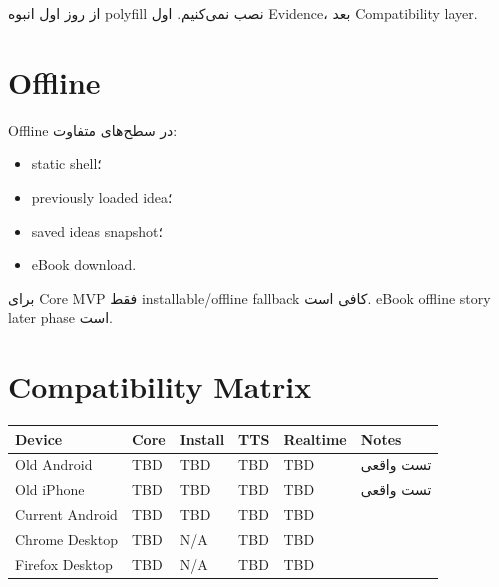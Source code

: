 \begin{warningbox}
از روز اول انبوه polyfill نصب نمی‌کنیم. اول Evidence، بعد Compatibility layer.
\end{warningbox}

\section{Offline}

Offline در سطح‌های متفاوت:
\begin{itemize}
  \item static shell؛
  \item previously loaded idea؛
  \item saved ideas snapshot؛
  \item eBook download.
\end{itemize}

برای Core MVP فقط installable/offline fallback کافی است. eBook offline story later phase است.

\section{Compatibility Matrix}

\begin{longtable}{p{2.8cm}p{1.5cm}p{1.6cm}p{1.5cm}p{1.8cm}p{2.8cm}}
\toprule
Device & Core & Install & TTS & Realtime & Notes \\
\midrule
Old Android & TBD & TBD & TBD & TBD & تست واقعی \\
Old iPhone & TBD & TBD & TBD & TBD & تست واقعی \\
Current Android & TBD & TBD & TBD & TBD & \\
Chrome Desktop & TBD & N/A & TBD & TBD & \\
Firefox Desktop & TBD & N/A & TBD & TBD & \\
\bottomrule
\end{longtable}
